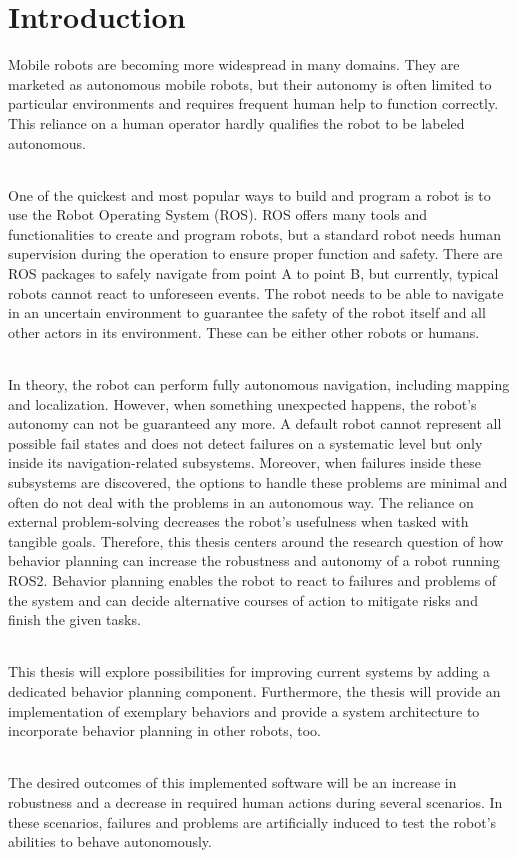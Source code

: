 \chapter{Introduction}
\label{cha:introduction}

Mobile robots are becoming more widespread in many domains. They are marketed as autonomous mobile robots, but their autonomy is often limited to particular environments and requires frequent human help to function correctly. This reliance on a human operator hardly qualifies the robot to be labeled autonomous. 
\subparagraph*{}
One of the quickest and most popular ways to build and program a robot is to use the Robot Operating System (ROS). ROS offers many tools and functionalities to create and program robots, but a standard robot needs human supervision during the operation to ensure proper function and safety. 
There are ROS packages to safely navigate from point A to point B, but currently, typical robots cannot react to unforeseen events. The robot needs to be able to navigate in an uncertain environment to guarantee the safety of the robot itself and all other actors in its environment. These can be either other robots or humans. 
\subparagraph*{}
In theory, the robot can perform fully autonomous navigation, including mapping and localization. However, when something unexpected happens, the robot's autonomy can not be guaranteed any more. 
A default robot cannot represent all possible fail states and does not detect failures on a systematic level but only inside its navigation-related subsystems. Moreover, when failures inside these subsystems are discovered, the options to handle these problems are minimal and often do not deal with the problems in an autonomous way. The reliance on external problem-solving decreases the robot's usefulness when tasked with tangible goals. 
Therefore, this thesis centers around the research question of how behavior planning can increase the robustness and autonomy of a robot running ROS2. 
Behavior planning enables the robot to react to failures and problems of the system and can decide alternative courses of action to mitigate risks and finish the given tasks.


\subparagraph*{}
This thesis will explore possibilities for improving current systems by adding a dedicated behavior planning component. Furthermore, the thesis will provide an implementation of exemplary behaviors and provide a system architecture to incorporate behavior planning in other robots, too.

\subparagraph*{}
The desired outcomes of this implemented software will be an increase in robustness and a decrease in required human actions during several scenarios. In these scenarios, failures and problems are artificially induced to test the robot's abilities to behave autonomously. 



